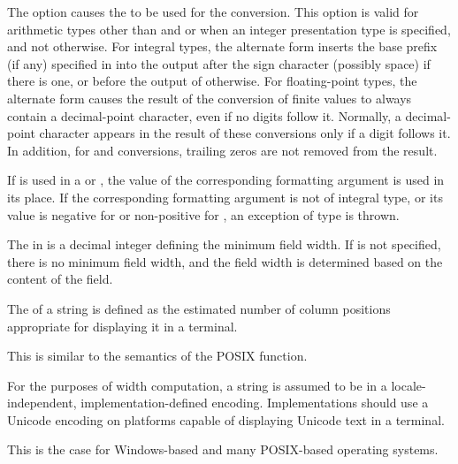 \pnum
The \tcode{\#} option causes the
to be used for the conversion.
This option is valid for arithmetic types other than
 and 
or when an integer presentation type is specified, and not otherwise.
For integral types,
the alternate form inserts the
base prefix (if any) specified in 
into the output after the sign character (possibly space) if there is one, or
before the output of  otherwise.
For floating-point types,
the alternate form causes the result of the conversion of finite values
to always contain a decimal-point character,
even if no digits follow it.
Normally, a decimal-point character appears in the result of these
conversions only if a digit follows it.
In addition, for  and  conversions,
trailing zeros are not removed from the result.

\pnum
If  is used in
a  or ,
the value of the corresponding formatting argument is used in its place.
If the corresponding formatting argument is not of integral type, or
its value is
negative for  or
non-positive for ,
an exception of type  is thrown.

\pnum
The  in
 is a decimal integer defining the minimum field width.
If  is not specified,
there is no minimum field width, and
the field width is determined based on the content of the field.

\pnum
{}%
The  of a string is defined as
the estimated number of column positions appropriate
for displaying it in a terminal.
\begin{note}
This is similar to the semantics of the POSIX  function.
\end{note}

\pnum
For the purposes of width computation,
a string is assumed to be in
a locale-independent, implementation-defined encoding.
Implementations should use a Unicode encoding
on platforms capable of displaying Unicode text in a terminal.
\begin{note}
This is the case for Windows-based and many POSIX-based operating systems.
\end{note}

